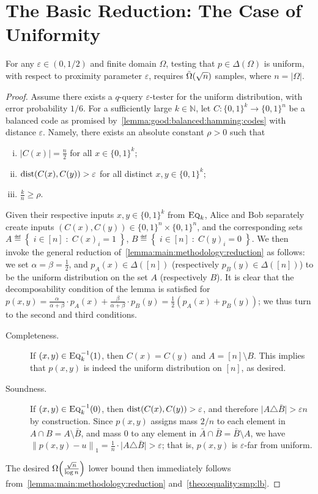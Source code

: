 \documentclass[11pt]{article}
\theoremstyle{remark}   	\newtheorem{remark}[theorem]{Remark}
\theoremstyle{definition}   	\newaliascnt{defn}{theorem}
\newcommand{\eps}{\ensuremath{\varepsilon}\xspace}
\newcommand{\domain}[1][{[n]}]{\ensuremath{#1}\xspace} \newcommand{\distribs}[1]{\Delta\!\left(#1\right)} \newcommand{\yes}{{\sf{}yes}\xspace}
\newcommand{\bigOmega}[1]{{\Omega\mleft( #1 \mright)}}
\newcommand{\tildeOmega}[1]{\operatorname{\tilde{\Omega}}\mleft( #1 \mright)}
\newcommand{\setOfSuchThat}[2]{ \left\{\; #1 \;\colon\; #2\; \right\} } 			\newcommand{\indicSet}[1]{\mathds{1}_{#1}}                                              \newcommand{\indic}[1]{\indicSet{\left\{#1\right\}}}                                             \newcommand{\disjunion}{\amalg}
\newcommand{\distop}{\operatorname{dist}}
\newcommand{\dist}[2]{\distop\mleft({#1, #2}\mright)}
\newcommand{\norm}[1]{\lVert#1{\rVert}}
\newcommand{\normone}[1]{{\norm{#1}}_1}
\newcommand{\abs}[1]{\left\lvert #1 \right\rvert}
\newcommand{\dabs}[1]{\lvert #1 \rvert}
\newcommand{\N}{\ensuremath{\mathbb{N}}\xspace}
\newcommand{\bitset}{\ensuremath{\{0,1\}}}
\newcommand{\EQ}[1][n]{\textsc{Eq}_{#1}}
\begin{document}
\section{The Basic Reduction: The Case of Uniformity}\label{sec:uniformity}
\begin{theorem}
\label{theo:uniformity:lb}
For any $\eps\in(0,1/2)$ and finite domain $\Omega$, testing that $p\in \distribs{\Omega}$ is uniform, with respect to proximity parameter $\eps$, requires $\tildeOmega{\sqrt{n}}$ samples, where $n = |\Omega|$.
\end{theorem}
\begin{proof}
Assume there exists a $q$-query $\eps$-tester for the uniform distribution, with error probability $1/6$. For a sufficiently large $k\in\N$, let $C\colon \bitset^k \to \bitset^n$ be a balanced code as promised by~\autoref{lemma:good:balanced:hamming:codes} with distance $\eps$. Namely, there exists an absolute constant $\rho > 0$ such that
\begin{enumerate}[(i)]
  \item $\abs{C(x)} = \frac{n}{2}$ for all $x\in \bitset^k$;
  \item $\dist{C(x)}{C(y)} > \eps$ for all distinct $x,y\in \bitset^k$;
  \item $\frac{k}{n} \geq \rho$.
\end{enumerate}
Given their respective inputs $x,y\in\{0,1\}^k$ from $\EQ[k]$, Alice and Bob separately create inputs $(C(x),C(y))\in\{0,1\}^n\times\{0,1\}^n$, and the corresponding sets $A\eqdef \setOfSuchThat{ i\in[n] }{ C(x)_i=1 }$, $B\eqdef \setOfSuchThat{ i\in[n] }{ C(y)_i =0 }$. We then invoke the general reduction of~\autoref{lemma:main:methodology:reduction} as follows: we set $\alpha=\beta=\frac{1}{2}$, and $p_A(x)\in\distribs{\domain}$ (respectively $p_B(y)\in\distribs{\domain}$) to be the uniform distribution on the set $A$ (respectively $B$). It is clear that the decomposability condition of the lemma is satisfied for $p(x,y) = \frac{\alpha}{\alpha+\beta} \cdot p_A(x)+\frac{\beta}{\alpha+\beta} \cdot p_B(y) = \frac{1}{2}(p_A(x)+p_B(y))$; we thus turn to the second and third conditions.

\begin{description}
  \item[Completeness.] If $(x,y)\in \EQ[k]^{-1}(1)$, then $C(x)=C(y)$ and $A=[n]\setminus B$. This implies that $p(x,y)$ is indeed the uniform distribution on $[n]$, as desired.
  \item[Soundness.] If $(x,y)\in \EQ[k]^{-1}(0)$, then $\dist{C(x)}{C(y)} > \eps$, and therefore $\dabs{A\triangle \bar{B}} > \eps n$ by construction. Since $p(x,y)$ assigns mass $2/n$ to each element in $A\cap B=A\setminus \bar{B}$, and mass $0$ to any element in $\bar{A}\cap \bar{B}=\bar{B}\setminus A$, we have $\normone{p(x,y) - u} = \frac{1}{n}\cdot\dabs{A\triangle \bar{B}} > \eps$; that is, $p(x,y)$ is \eps-far from uniform.
\end{description}
The desired $\bigOmega{\frac{\sqrt{n}}{\log n}}$ lower bound then immediately follows from~\autoref{lemma:main:methodology:reduction} and~\autoref{theo:equality:smp:lb}.
\end{proof} 
\end{document}
